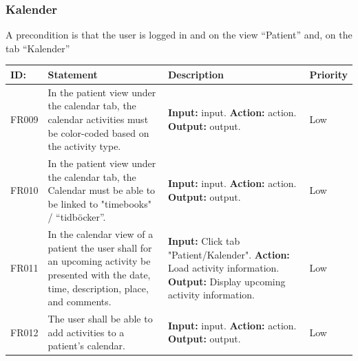 \documentclass{scrreprt}
\begin{document}
\subsubsection{Kalender}
A precondition is that the user is logged in and on the view “Patient” and, on the tab “Kalender”
\begin{center}
\begin{tabularx}{\linewidth}{| l | X | X | l |}
\hline
\textbf{ID:} & \textbf{Statement} & \textbf{Description} & \textbf{Priority} \\ 
\hline
FR009 & In the patient view under the calendar tab, the calendar activities must be color-coded based on the activity type. & \textbf{Input:} input.
\newline \textbf{Action:} action.
\newline \textbf{Output:} output. & Low \\ 
\hline
FR010 & In the patient view under the calendar tab, the Calendar must be able to be linked to "timebooks" / “tidböcker”. & \textbf{Input:} input.
\newline \textbf{Action:} action.
\newline \textbf{Output:} output. & Low \\ 
\hline
FR011 & In the calendar view of a patient the user shall for an upcoming activity be presented with the date, time, description, place, and comments. & \textbf{Input:} Click tab "Patient/Kalender".
\newline \textbf{Action:} Load activity information.
\newline \textbf{Output:} Display upcoming  activity information. & Low \\ 
\hline
FR012 & The user shall be able to add activities to a patient's calendar.  & \textbf{Input:} input.
\newline \textbf{Action:} action.
\newline \textbf{Output:} output. & Low \\ 
\hline
\end{tabularx}
\end{center}
\end{document}
